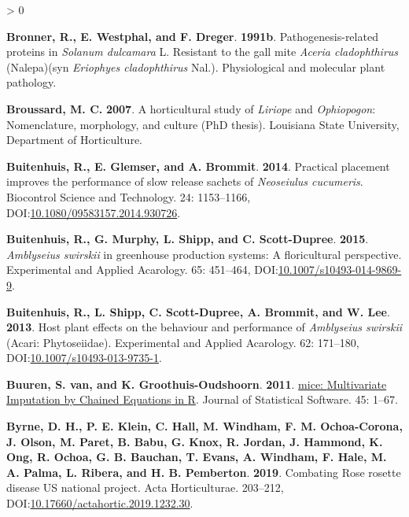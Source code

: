 \documentclass{ufdissertation}[overrideChapters] %
\newlength{\cslhangindent}
\newenvironment{CSLReferences}[2] %
 {%
  \setlength{\parindent}{0pt}
  \ifodd #1 \everypar{\setlength{\hangindent}{\cslhangindent}}\ignorespaces\fi
  \ifnum #2 > 0
  \setlength{\parskip}{#2\baselineskip}
  \fi
 }%
 {}
\begin{document}
{\begin{CSLReferences}{1}{1}
\leavevmode{}%
\textbf{Bronner, R., E. Westphal, and F. Dreger}. \textbf{1991b}. Pathogenesis-related proteins in {\emph{Solanum dulcamara}} {L.} Resistant to the gall mite {\emph{Aceria cladophthirus}} ({Nalepa})(syn {\emph{Eriophyes cladophthirus}} {Nal.}). Physiological and molecular plant pathology.

\leavevmode{}%
\textbf{Broussard, M. C.} \textbf{2007}. A horticultural study of {\emph{Liriope}} and {\emph{Ophiopogon}}: Nomenclature, morphology, and culture (PhD thesis). Louisiana State University, Department of Horticulture.

\leavevmode{}%
\textbf{Buitenhuis, R., E. Glemser, and A. Brommit}. \textbf{2014}. Practical placement improves the performance of slow release sachets of {\emph{Neoseiulus cucumeris}}. Biocontrol Science and Technology. 24: 1153--1166, DOI:\href{https://doi.org/10.1080/09583157.2014.930726}{10.1080/09583157.2014.930726}.

\leavevmode{}%
\textbf{Buitenhuis, R., G. Murphy, L. Shipp, and C. Scott-Dupree}. \textbf{2015}. {\emph{Amblyseius swirskii}} in greenhouse production systems: A floricultural perspective. Experimental and Applied Acarology. 65: 451--464, DOI:\href{https://doi.org/10.1007/s10493-014-9869-9}{10.1007/s10493-014-9869-9}.

\leavevmode{}%
\textbf{Buitenhuis, R., L. Shipp, C. Scott-Dupree, A. Brommit, and W. Lee}. \textbf{2013}. Host plant effects on the behaviour and performance of {\emph{Amblyseius swirskii}} ({Acari}: {Phytoseiidae}). Experimental and Applied Acarology. 62: 171--180, DOI:\href{https://doi.org/10.1007/s10493-013-9735-1}{10.1007/s10493-013-9735-1}.

\leavevmode{}%
\textbf{Buuren, S. van, and K. Groothuis-Oudshoorn}. \textbf{2011}. \href{https://www.jstatsoft.org/v45/i03/}{{mice}: {Multivariate} {Imputation} by {Chained} {Equations} in {R}}. Journal of Statistical Software. 45: 1--67.

\leavevmode{}%
\textbf{Byrne, D. H., P. E. Klein, C. Hall, M. Windham, F. M. Ochoa-Corona, J. Olson, M. Paret, B. Babu, G. Knox, R. Jordan, J. Hammond, K. Ong, R. Ochoa, G. B. Bauchan, T. Evans, A. Windham, F. Hale, M. A. Palma, L. Ribera, and H. B. Pemberton}. \textbf{2019}. Combating {Rose rosette disease} {US} national project. Acta Horticulturae. 203--212, DOI:\href{https://doi.org/10.17660/actahortic.2019.1232.30}{10.17660/actahortic.2019.1232.30}.


\end{CSLReferences}}
\end{document}
